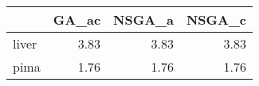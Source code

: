 \begin{tabular}{lrrr}
\toprule
{} &  GA\_ac &  NSGA\_a &  NSGA\_c \\
\midrule
liver &   3.83 &    3.83 &    3.83 \\
pima  &   1.76 &    1.76 &    1.76 \\
\bottomrule
\end{tabular}
